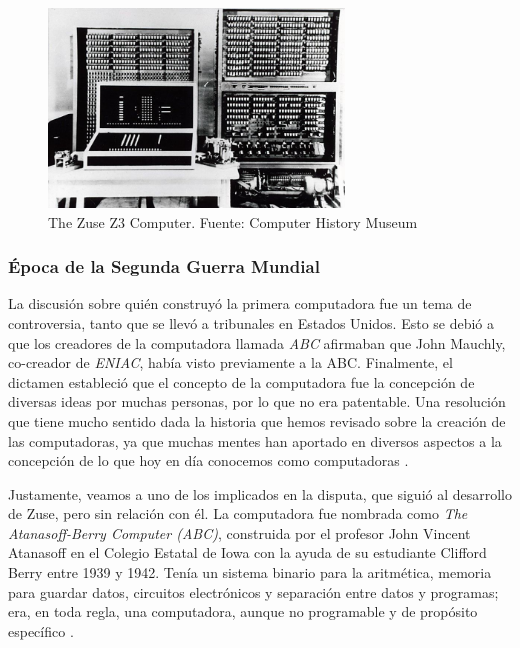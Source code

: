\documentclass[letterpaper,12pt,oneside]{book}
\begin{document}
		\begin{figure}
		    \centering
		    \includegraphics[width=0.7\textwidth]{media/Historia/CHM_computers_1941.zusez3.jpg}
		    \caption{The Zuse Z3 Computer. Fuente: Computer History Museum}
	    	\label{fig:zuse_z3}
		\end{figure}
		
		
		
        \subsubsection{Época de la Segunda Guerra Mundial}
		
		La discusión sobre quién construyó la primera computadora fue un tema de controversia, tanto que se llevó a tribunales en Estados Unidos. Esto se debió a que los creadores
		de la computadora llamada \textit{ABC} afirmaban que John Mauchly, co-creador de \textit{ENIAC}, había visto previamente a la ABC. Finalmente, el dictamen estableció
		que el concepto de la computadora fue la concepción de diversas ideas por muchas personas, por lo que no era patentable. Una resolución que tiene mucho sentido
		dada la historia que hemos revisado sobre la creación de las computadoras, ya que muchas mentes han aportado en diversos aspectos a la concepción de lo que hoy
		en día conocemos como computadoras \cite{computer_history_museum_computers_nodate}.
		
		
		Justamente, veamos a uno de los implicados en la disputa, que siguió al desarrollo de Zuse, pero sin relación con él. La computadora fue nombrada como 
		\textit{The Atanasoff-Berry Computer (ABC)}, construida por el profesor John Vincent Atanasoff 
		en el Colegio Estatal de Iowa con la ayuda de su estudiante Clifford Berry entre 1939 y 1942. Tenía un sistema binario para la aritmética, memoria
		para guardar datos, circuitos electrónicos y separación entre datos y programas; era, en toda regla, una computadora, aunque no programable y de propósito
		específico \cite[pp. 212-218]{ifrah_universal_2001}.
  
\end{document}
